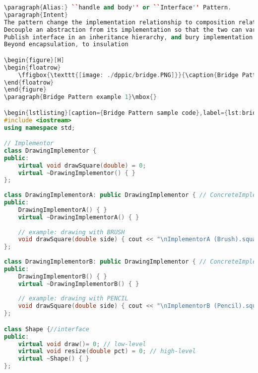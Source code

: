\documentclass{book}
\begin{document}
\begin{lstlisting}[caption={Facade Pattern sample 3}, language=C++]
\paragraph{Alias:} ``handle and body'' or ``Interface'' Pattern.
\paragraph{Intent}
The pattern change the implementation relationship to composition relationship.
Decouple an abstraction from its implementation so that the two can vary independently.
Publish interface in an inheritance hierarchy, and bury implementation in its own inheritance hierarchy.
Beyond encapsulation, to insulation

\begin{figure}[H]
\begin{floatrow}
    \ffigbox{\texttt{[image: ./dppic/bridge.PNG]}}{\caption{Bridge Pattern}\label{bridgeadapterp}}
\end{floatrow}
\end{figure}
\paragraph{Bridge Pattern example 1}\mbox{}

\begin{lstlisting}[caption={Bridge Pattern sample code},label={lst:bridgepsc},language=C++]
#include <iostream>
using namespace std;

// Implementor
class DrawingImplementor {
public:
    virtual void drawSquare(double) = 0;
    virtual ~DrawingImplementor() { }
};
 
class DrawingImplementorA: public DrawingImplementor { // ConcreteImplementor A
public:
    DrawingImplementorA() { }
    virtual ~DrawingImplementorA() { }
 
	// example: drawing with BRUSH
    void drawSquare(double side) { cout << "\nImplementorA (Brush).square with side = "<< side << endl;}
};
 
class DrawingImplementorB: public DrawingImplementor { // ConcreteImplementor B
public:
    DrawingImplementorB() { }
    virtual ~DrawingImplementorB() { }
 
	// example: drawing with PENCIL
    void drawSquare(double side) { cout << "\nImplementorB (Pencil).square with side = "<< side << endl; }
};

class Shape {//interface
public:
    virtual void draw()= 0; // low-level
    virtual void resize(double pct) = 0; // high-level
    virtual ~Shape() { }
};
 

\end{lstlisting}
\end{document}
